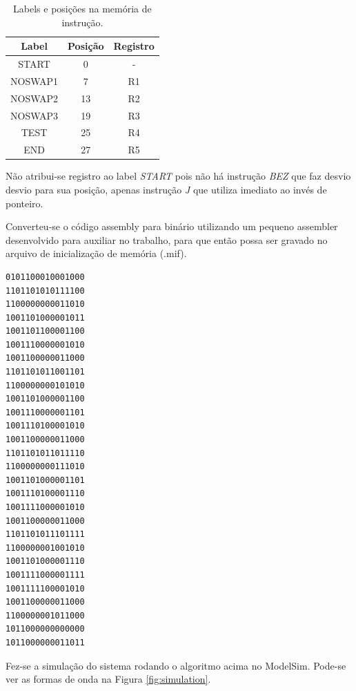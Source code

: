 \documentclass[11pt,a4paper,titlepage]{article}
\begin{document}
\begin{table}[!h]
\centering
\begin{tabular}{| c | c | c |}
\hline
Label & Posição & Registro\\
\hline
START & 0 & -\\
\hline
NOSWAP1 & 7 & R1\\
\hline
NOSWAP2 & 13 & R2\\
\hline
NOSWAP3 & 19 & R3\\
\hline
TEST & 25 & R4\\
\hline
END & 27 & R5\\
\hline
\end{tabular}
\caption{Labels e posições na memória de instrução.}
\label{tab:labels}
\end{table}
%

Não atribui-se registro ao label \textit{START} pois não há instrução \textit{BEZ} que faz desvio desvio para sua posição, apenas instrução \textit{J} que utiliza imediato ao invés de ponteiro.

Converteu-se o código assembly para binário utilizando um pequeno assembler desenvolvido para auxiliar no trabalho, para que então possa ser gravado no arquivo de inicialização de memória (.mif).

\begin{lstlisting}
0101100010001000
1101101010111100
1100000000011010
1001101000001011
1001101100001100
1001110000001010
1001100000011000
1101101011001101
1100000000101010
1001101000001100
1001110000001101
1001110100001010
1001100000011000
1101101011011110
1100000000111010
1001101000001101
1001110100001110
1001111000001010
1001100000011000
1101101011101111
1100000001001010
1001101000001110
1001111000001111
1001111100001010
1001100000011000
1100000001011000
1011000000000000
1011000000011011
\end{lstlisting}

Fez-se a simulação do sistema rodando o algoritmo acima no ModelSim. Pode-se ver as formas de onda na Figura \ref{fig:simulation}.
\end{document}
